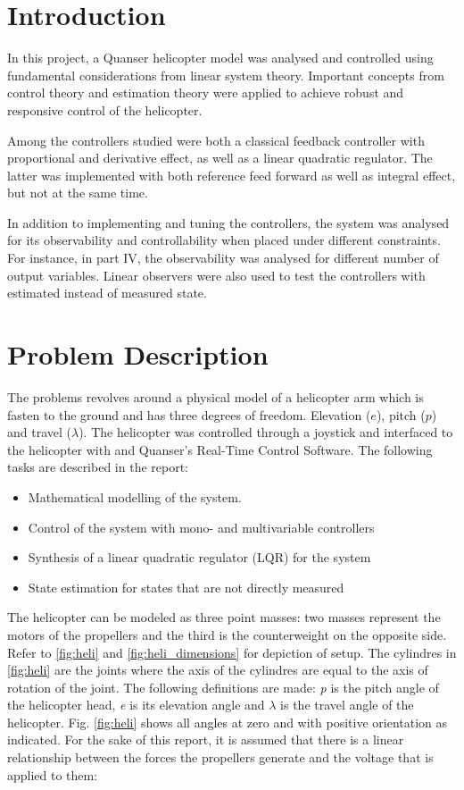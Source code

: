 \section{Introduction}\label{sec:intro}
In this project, a Quanser helicopter model was analysed and controlled using fundamental considerations from linear system theory. Important concepts from control theory and estimation theory were applied to achieve robust and responsive control of the helicopter. 

Among the controllers studied were both a classical feedback controller with proportional and derivative effect, as well as a linear quadratic regulator. The latter was implemented with both reference feed forward as well as integral effect, but not at the same time. 

In addition to implementing and tuning the controllers, the system was analysed for its observability and controllability when placed under different constraints. For instance, in part IV, the observability was analysed for different number of output variables. Linear observers were also used to test the controllers with estimated instead of measured state.

\section{Problem Description}\label{sec:prob_descr}
The problems revolves around a physical model of a helicopter arm which is fasten to the ground and has three degrees of freedom. Elevation ($e$), pitch ($p$) and travel ($\lambda$). 
The helicopter was controlled through a joystick and interfaced to the helicopter with \MATLAB and Quanser's \QuaRC Real-Time Control Software. The following tasks are described in the report:

\begin{itemize}
    \item Mathematical modelling of the system.
    \item Control of the system with mono- and multivariable controllers
    \item Synthesis of a linear quadratic regulator (LQR) for the system
    \item State estimation for states that are not directly measured 
\end{itemize}

The helicopter can be modeled as three point masses: two masses represent the motors of the propellers and the third is the counterweight on the opposite side. Refer to \cref{fig:heli} and \cref{fig:heli_dimensions} for depiction of setup. The cylindres in \cref{fig:heli} are the joints where the axis of the cylindres are equal to the axis of rotation of the joint. The following definitions are made: \textit{p} is the pitch angle of the helicopter head, \textit{e} is its elevation angle and \textit{$\lambda$} is the travel angle of the helicopter. Fig. \ref{fig:heli} shows all angles at zero and with positive orientation as indicated. For the sake of this report, it is assumed that there is a linear relationship between the forces the propellers generate and the voltage that is applied to them:


